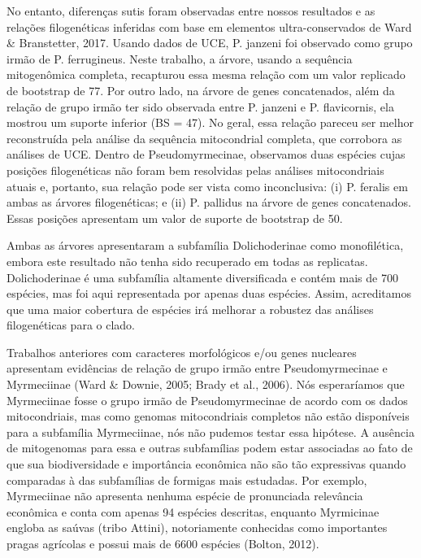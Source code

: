 \documentclass[../DISSERTACAO_MAIN.tex]{subfiles}
\begin{document}
	No entanto, diferenças sutis foram observadas entre nossos resultados e as relações filogenéticas inferidas com base em elementos ultra-conservados de Ward \& Branstetter, 2017. Usando dados de UCE, P. janzeni foi observado como grupo irmão de P. ferrugineus. Neste trabalho, a árvore, usando a sequência mitogenômica completa, recapturou essa mesma relação com um valor replicado de bootstrap de 77. Por outro lado, na árvore de genes concatenados, além da relação de grupo irmão ter sido observada entre P. janzeni e P. flavicornis, ela mostrou um suporte inferior (BS = 47). No geral, essa relação pareceu ser melhor reconstruída pela análise da sequência mitocondrial completa, que corrobora as análises de UCE.
	Dentro de Pseudomyrmecinae, observamos duas espécies cujas posições filogenéticas não foram bem resolvidas pelas análises mitocondriais atuais e, portanto, sua relação pode ser vista como inconclusiva: (i) P. feralis em ambas as árvores filogenéticas; e (ii) P. pallidus na árvore de genes concatenados. Essas posições apresentam um valor de suporte de bootstrap de 50.
	
	Ambas as árvores apresentaram a subfamília Dolichoderinae como monofilética, embora este resultado não tenha sido recuperado em todas as replicatas. Dolichoderinae é uma subfamília altamente diversificada e contém mais de 700 espécies, mas foi aqui representada por apenas duas espécies. Assim, acreditamos que uma maior cobertura de espécies irá melhorar a robustez das análises filogenéticas para o clado.
	
	Trabalhos anteriores com caracteres morfológicos e/ou genes nucleares apresentam evidências de relação de grupo irmão entre Pseudomyrmecinae e Myrmeciinae (Ward \& Downie, 2005; Brady et al., 2006). Nós esperaríamos que Myrmeciinae fosse o grupo irmão de Pseudomyrmecinae de acordo com os dados mitocondriais, mas como genomas mitocondriais completos não estão disponíveis para a subfamília Myrmeciinae, nós não pudemos testar essa hipótese. A ausência de mitogenomas para essa e outras subfamílias podem estar associadas ao fato de que sua biodiversidade e importância econômica não são tão expressivas quando comparadas à das subfamílias de formigas mais estudadas. Por exemplo, Myrmeciinae não apresenta nenhuma espécie de pronunciada relevância econômica e conta com apenas 94 espécies descritas, enquanto Myrmicinae engloba as saúvas (tribo Attini), notoriamente conhecidas como importantes pragas agrícolas e possui mais de 6600 espécies (Bolton, 2012).
	
\end{document}
